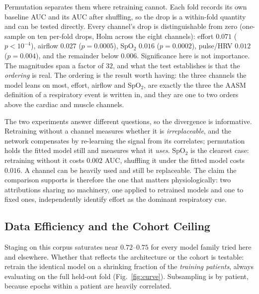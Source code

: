 \documentclass{ieeeaccess}
\begin{document}
Permutation separates them where retraining cannot. Each fold records its own baseline
AUC and its AUC after shuffling, so the drop is a within-fold quantity and can be tested
directly. Every channel's drop is distinguishable from zero (one-sample on ten per-fold drops,
Holm across the eight channels): effort $0.071$ ($p<10^{-4}$), airflow $0.027$ ($p=0.0005$),
SpO$_2$ $0.016$ ($p=0.0002$), pulse/HRV $0.012$ ($p=0.004$), and the remainder below $0.006$.
Significance here is not importance. The magnitudes span a factor of $32$, and what the test
establishes is that the \emph{ordering} is real. The ordering is the
result worth having: the three channels the model leans on most, effort, airflow and SpO$_2$,
are exactly the three the AASM definition of a respiratory event is written in, and they are
one to two orders above the cardiac and muscle channels.

The two experiments answer different questions, so the divergence is informative. Retraining without a channel measures whether it is \emph{irreplaceable}, and
the network compensates by re-learning the signal from its correlates; permutation holds the
fitted model still and measures what it \emph{uses}. SpO$_2$ is the clearest case: retraining
without it costs $0.002$ AUC, shuffling it under the fitted model costs $0.016$. A channel can
be heavily used and still be replaceable. The claim the comparison supports is therefore the
one that matters physiologically: two attributions sharing no machinery, one applied to
retrained models and one to fixed ones, independently identify effort as the dominant
respiratory cue.

\subsection{Data Efficiency and the Cohort Ceiling}
\label{sec:curve}
Staging on this corpus saturates near $0.72$--$0.75$ for every model family tried here and
elsewhere. Whether that reflects the architecture or the cohort is testable: retrain the
identical model on a shrinking fraction of the \emph{training patients}, always evaluating on
the full held-out fold (Fig.~\ref{fig:curve}). Subsampling is by patient,
because epochs within a patient are heavily correlated.
\end{document}
